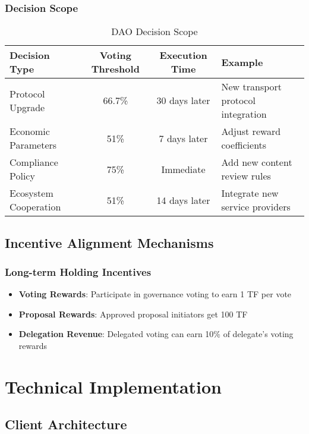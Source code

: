 \documentclass[12pt,a4paper]{article}
\begin{document}
\subsubsection{Decision Scope}

\begin{table}[htbp]
\centering
\begin{tabular}{|l|c|c|l|}
\hline
\textbf{Decision Type} & \textbf{Voting Threshold} & \textbf{Execution Time} & \textbf{Example} \\
\hline
Protocol Upgrade & 66.7\% & 30 days later & New transport protocol integration \\
\hline
Economic Parameters & 51\% & 7 days later & Adjust reward coefficients \\
\hline
Compliance Policy & 75\% & Immediate & Add new content review rules \\
\hline
Ecosystem Cooperation & 51\% & 14 days later & Integrate new service providers \\
\hline
\end{tabular}
\caption{DAO Decision Scope}
\end{table}

\subsection{Incentive Alignment Mechanisms}

\subsubsection{Long-term Holding Incentives}
\begin{itemize}
    \item \textbf{Voting Rewards}: Participate in governance voting to earn 1 TF per vote
    \item \textbf{Proposal Rewards}: Approved proposal initiators get 100 TF
    \item \textbf{Delegation Revenue}: Delegated voting can earn 10\% of delegate's voting rewards
\end{itemize}

\section{Technical Implementation}

\subsection{Client Architecture}
\end{document}
